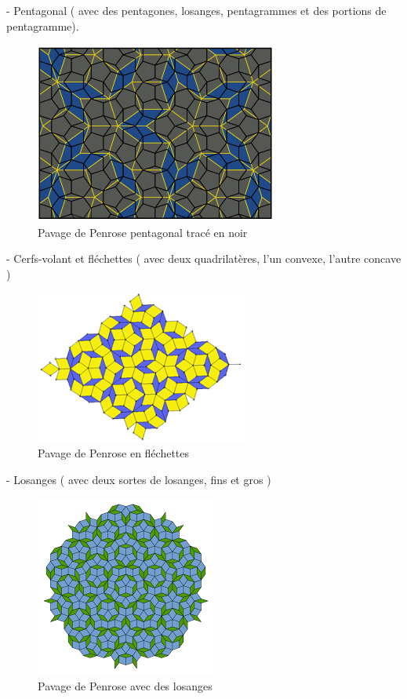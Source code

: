 \documentclass{article}
\begin{document}
\hspace{1cm}

- Pentagonal ( avec des pentagones, losanges, pentagrammes et des portions de pentagramme).

\begin{figure} [h]
    \center
    \includegraphics [scale=0.4] {image/penrose_pentagone.png}
    \caption{Pavage de Penrose pentagonal tracé en noir}
\end{figure}

\hspace{1.5cm}

- Cerfs-volant et fléchettes ( avec deux quadrilatères, l'un convexe, l'autre concave )

\begin{figure} [h]
    \center
    \includegraphics [scale=0.5] {image/penrose_flechette.png}
    \caption{Pavage de Penrose en fléchettes}
\end{figure}

- Losanges ( avec deux sortes de losanges, fins et gros )

\begin{figure} [h]
    \center
    \includegraphics [scale=0.5] {image/penrose_losange.png}
    \caption{Pavage de Penrose avec des losanges}
\end{figure}
\end{document}
